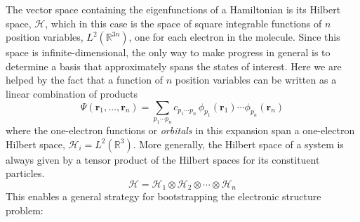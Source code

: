 The vector space containing the eigenfunctions of a Hamiltonian is its Hilbert
space, \(\mathcal{H}\), which in this case is the space of square integrable
functions of \(n\) position variables,
\(
    L^2(\mathbb{R}^{3n})
\),
one for each electron in the molecule.
Since this space is infinite-dimensional, the only way to make progress in
general is to determine a basis that approximately spans the states of interest.
Here we are helped by the fact that a function of \(n\) position variables can
be written as a linear combination of products
\begin{equation}
    \Psi(\mathbf{r}_1, \dots, \mathbf{r}_n)
    =
    \sum_{p_1\cdots p_n}
    c_{p_1\cdots p_n}\,
    \phi_{p_1}(\mathbf{r}_1)
    \cdots
    \phi_{p_n}(\mathbf{r}_n)
\end{equation}
where the one-electron functions or {\itshape orbitals} in this expansion span a
one-electron Hilbert space,
\(
    \mathcal{H}_i
    =
    L^2(\mathbb{R}^3)
\).
More generally, the Hilbert space of a system is always given by a tensor
product of the Hilbert spaces for its constituent particles.
\begin{equation}
    \mathcal{H}
    =
    \mathcal{H}_1
    \otimes
    \mathcal{H}_2
    \otimes
    \cdots
    \otimes
    \mathcal{H}_n
\end{equation}
This enables a general strategy for bootstrapping the electronic structure
problem:
